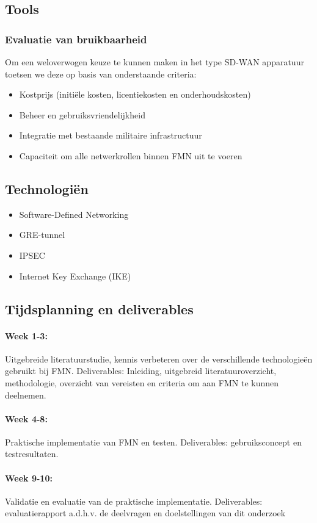 \subsection{Tools}
\subsubsection*{Evaluatie van bruikbaarheid}
Om een weloverwogen keuze te kunnen maken in het type SD-WAN apparatuur toetsen we deze op basis van onderstaande criteria:
\begin{itemize}
    \item Kostprijs (initiële kosten, licentiekosten en onderhoudskosten)
    \item Beheer en gebruiksvriendelijkheid
    \item Integratie met bestaande militaire infrastructuur
    \item Capaciteit om alle netwerkrollen binnen FMN uit te voeren
\end{itemize}

\subsection{Technologiën}
\begin{itemize}
    \item Software-Defined Networking
    \item GRE-tunnel
    \item IPSEC
    \item Internet Key Exchange (IKE)
\end{itemize}

\subsection{Tijdsplanning en deliverables}
\paragraph{Week 1-3:} 
Uitgebreide literatuurstudie, kennis verbeteren over de verschillende technologieën gebruikt bij FMN.
Deliverables: Inleiding, uitgebreid literatuuroverzicht, methodologie, overzicht van vereisten en criteria om aan FMN te kunnen deelnemen.
\paragraph{Week 4-8:}
Praktische implementatie van FMN en testen.
Deliverables: gebruiksconcept en testresultaten.
\paragraph{Week 9-10:}
Validatie en evaluatie van de praktische implementatie.
Deliverables: evaluatierapport a.d.h.v. de deelvragen en doelstellingen van dit onderzoek 


